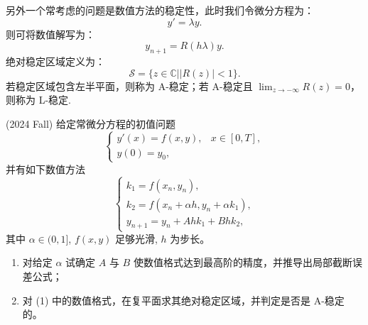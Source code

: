 另外一个常考虑的问题是数值方法的稳定性，此时我们令微分方程为：
\[
    y' = \lambda y.
\]
则可将数值解写为：
\[
    y_{n+1} = R(h\lambda)y.
\]
绝对稳定区域定义为：
\[
    \mathscr{S} = \{z\in \mathbb{C}\big| |R(z)|<1\}.
\]
若稳定区域包含左半平面，则称为 A-稳定；若 A-稳定且 $\lim_{z\to -\infty} R(z) = 0$，则称为 L-稳定.
\begin{problembox}
    \begin{example}
    (2024 Fall) 给定常微分方程的初值问题
    \[
    \begin{cases}
        y'(x) = f(x, y), & x \in [0, T], \\
        y(0) = y_0,
    \end{cases}
    \]
    并有如下数值方法
    \[
    \begin{cases}
        k_1 = f(x_n, y_n), \\
        k_2 = f(x_n + \alpha h, y_n + \alpha k_1), \\
        y_{n+1} = y_n + Ahk_1 + Bhk_2,
    \end{cases}
    \]
    其中 $\alpha \in (0, 1]$, $f(x, y)$ 足够光滑, $h$ 为步长。

\begin{enumerate}
    \item 对给定 $\alpha$ 试确定 $A$ 与 $B$ 使数值格式达到最高阶的精度，并推导出局部截断误差公式；
    
    \item 对 (1) 中的数值格式，在复平面求其绝对稳定区域，并判定是否是 A-稳定的。
\end{enumerate}
    \end{example}
    \begin{solution}
        
    \end{solution}
\end{problembox}



